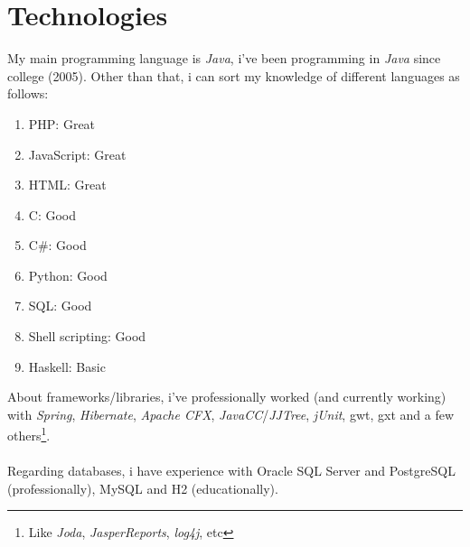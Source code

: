 \documentclass[10pt]{article}
\newenvironment{enum}{
 \begin{enumerate}
  \setlength{\itemsep}{1pt}
  \setlength{\parskip}{0pt}
  \setlength{\parsep}{0pt}
}{\end{enumerate}}
\begin{document}
\section*{Technologies}
My main programming language is \emph{Java}, i've been programming in \emph{Java} since college (2005). Other than that, i can sort my knowledge of different languages as follows:
\begin{multicols}{3}
\begin{enum}
	\item PHP: Great
	\item JavaScript: Great
	\item HTML: Great
	\item C: Good
	\item C\#: Good
	\item Python: Good
	\item SQL: Good
	\item Shell scripting: Good
	\item Haskell: Basic
\end{enum}
\end{multicols}

\hspace{-6.21mm} About frameworks/libraries, i've professionally worked (and currently working) with \emph{Spring}, \emph{Hibernate}, \emph{Apache CFX}, \emph{JavaCC}/\emph{JJTree}, \emph{jUnit}, \gls{gwt}, \gls{gxt} and a few others\footnote{Like \emph{Joda}, \emph{JasperReports}, \emph{log4j}, etc}.\\\\
Regarding databases, i have experience with Oracle SQL Server and PostgreSQL  (professionally), MySQL and H2 (educationally).
\end{document}
